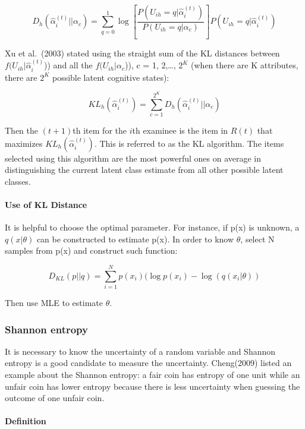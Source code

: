 \documentclass[
]{article}
\begin{document}
\[D_h(\hat \alpha_i^{(t)}||\alpha_c)=\sum_{q=0}^1\log \left[\frac{P(U_{ih}=q|\hat \alpha_i^{(t)})}{P(U_{ih}=q|\alpha_c)}\right]P(U_{ih}=q|\hat \alpha_i^{(t)})\]

Xu et al.~(2003) stated using the straight sum of the KL distances
between \(f(U_{ih}|\hat \alpha_i^{(t)}\))) and all the
\(f(U_{ih}|\alpha_c\))), c = 1, 2,\ldots, \(2^K\) (when there are K
attributes, there are \(2^K\) possible latent cognitive states):

\[KL_h(\hat \alpha_i^{(t)})=\sum _{c=1}^{2^K}D_h(\hat \alpha_i^{(t)}||\alpha_c)\]

Then the \((t + 1)\)th item for the \(i\)th examinee is the item in
\(R(t)\) that maximizes \(KL_h(\hat \alpha_i^{(t)})\). This is referred
to as the KL algorithm. The items selected using this algorithm are the
most powerful ones on average in distinguishing the current latent class
estimate from all other possible latent classes.

\hypertarget{use-of-kl-distance}{%
\paragraph{Use of KL Distance}\label{use-of-kl-distance}}

It is helpful to choose the optimal parameter. For instance, if p(x) is
unknown, a \(q(x|\theta)\) can be constructed to estimate p(x). In order
to know \(\theta\), select N samples from p(x) and construct such
function:

\[D_{KL}(p||q)=\sum_{i=1}^Np(x_i)(\log p(x_i)-\log(q(x_i|\theta))\]

Then use MLE to estimate \(\theta\).

\hypertarget{shannon-entropy}{%
\subsubsection{Shannon entropy}\label{shannon-entropy}}

It is necessary to know the uncertainty of a random variable and Shannon
entropy is a good candidate to measure the uncertainty. Cheng(2009)
listed an example about the Shannon entropy: a fair coin has entropy of
one unit while an unfair coin has lower entropy because there is less
uncertainty when guessing the outcome of one unfair coin.

\hypertarget{definition-3}{%
\paragraph{Definition}\label{definition-3}}
\end{document}
